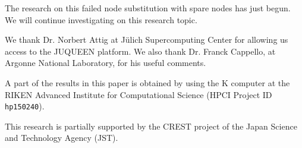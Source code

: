 \documentclass[Afour,times,sageh]{sagej}
\begin{document}
The research on this failed node substitution with spare nodes has
just begun. We will continue investigating on this research topic.

\begin{acks}
We thank Dr. Norbert Attig at J\"{u}lich Supercomputing Center for
allowing us access to the JUQUEEN platform. We also thank Dr. Franck
Cappello, at Argonne National Laboratory, for his useful
comments.

A part of the results in this paper is obtained by using the K
computer at the RIKEN Advanced Institute for Computational
Science (HPCI Project ID {\tt hp150240}).
\end{acks}

\begin{funding}
This research is partially supported by the CREST project of
the Japan Science and Technology Agency (JST).
\end{funding}


\end{document}
